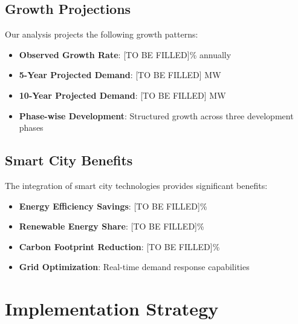 \documentclass[12pt,a4paper]{article}
\begin{document}
\subsection{Growth Projections}
Our analysis projects the following growth patterns:

\begin{itemize}
    \item \textbf{Observed Growth Rate}: [TO BE FILLED]\% annually
    \item \textbf{5-Year Projected Demand}: [TO BE FILLED] MW
    \item \textbf{10-Year Projected Demand}: [TO BE FILLED] MW
    \item \textbf{Phase-wise Development}: Structured growth across three development phases
\end{itemize}

\subsection{Smart City Benefits}
The integration of smart city technologies provides significant benefits:

\begin{itemize}
    \item \textbf{Energy Efficiency Savings}: [TO BE FILLED]\%
    \item \textbf{Renewable Energy Share}: [TO BE FILLED]\%
    \item \textbf{Carbon Footprint Reduction}: [TO BE FILLED]\%
    \item \textbf{Grid Optimization}: Real-time demand response capabilities
\end{itemize}

\section{Implementation Strategy}
\end{document}

